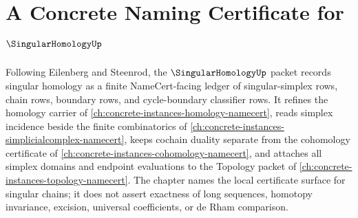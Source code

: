 \chapter{A Concrete Naming Certificate for $\SingularHomologyUp$}
\label{ch:concrete-instances-singular-homology-namecert}

Following Eilenberg and Steenrod, the $\SingularHomologyUp$ packet records singular homology as a finite NameCert-facing ledger of singular-simplex rows, chain rows, boundary rows, and cycle-boundary classifier rows. It refines the homology carrier of \autoref{ch:concrete-instances-homology-namecert}, reads simplex incidence beside the finite combinatorics of \autoref{ch:concrete-instances-simplicialcomplex-namecert}, keeps cochain duality separate from the cohomology certificate of \autoref{ch:concrete-instances-cohomology-namecert}, and attaches all simplex domains and endpoint evaluations to the Topology packet of \autoref{ch:concrete-instances-topology-namecert}. The chapter names the local certificate surface for singular chains; it does not assert exactness of long sequences, homotopy invariance, excision, universal coefficients, or de Rham comparison.

